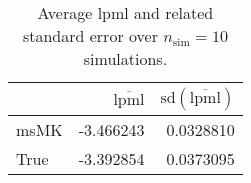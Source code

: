 \begin{table}[H]

\caption{Average lpml and related standard error over $n_{\text{sim}} = 10$ simulations.}
\centering
\begin{tabular}[t]{lrr}
\toprule
  & $\overbar{\text{lpml}}$ & $\text{sd}(\overbar{\text{lpml}})$\\
\midrule
msMK & -3.466243 & 0.0328810\\
True & -3.392854 & 0.0373095\\
\bottomrule
\end{tabular}
\end{table}